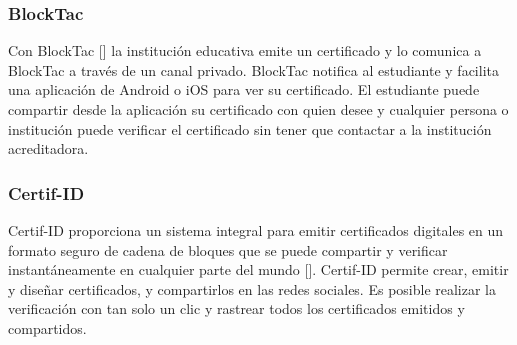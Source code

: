 


\subsubsection{BlockTac}
Con BlockTac [\cite{83}] la institución educativa emite un certificado y lo comunica a BlockTac a través de un canal privado. BlockTac notifica al estudiante y facilita una aplicación de Android o iOS para ver su certificado. El estudiante puede compartir desde la aplicación su certificado con quien desee y cualquier persona o institución puede verificar el certificado sin tener que contactar a la institución acreditadora.

%
\subsubsection{Certif-ID}
Certif-ID proporciona un sistema integral para emitir certificados digitales en un formato seguro de cadena de bloques que se puede compartir y verificar instantáneamente en cualquier parte del mundo [\cite{84}]. Certif-ID permite crear, emitir y diseñar certificados, y compartirlos en las redes sociales. Es posible realizar la verificación con tan solo un clic y  rastrear todos los certificados emitidos y compartidos.


